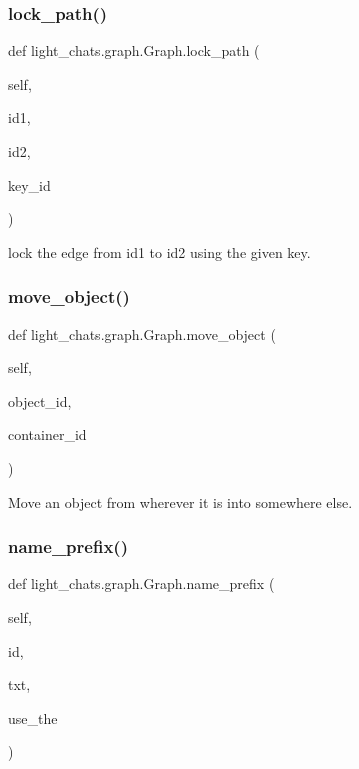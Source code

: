 \subsubsection{\texorpdfstring{lock\+\_\+path()}{lock\_path()}}
{\footnotesize\ttfamily def light\+\_\+chats.\+graph.\+Graph.\+lock\+\_\+path (\begin{DoxyParamCaption}\item[{}]{self,  }\item[{}]{id1,  }\item[{}]{id2,  }\item[{}]{key\+\_\+id }\end{DoxyParamCaption})}

\begin{DoxyVerb}lock the edge from id1 to id2 using the given key.
\end{DoxyVerb}
 \mbox{\label{classlight__chats_1_1graph_1_1Graph_a8a92252320777766ddab522549671f43}} 
\subsubsection{\texorpdfstring{move\+\_\+object()}{move\_object()}}
{\footnotesize\ttfamily def light\+\_\+chats.\+graph.\+Graph.\+move\+\_\+object (\begin{DoxyParamCaption}\item[{}]{self,  }\item[{}]{object\+\_\+id,  }\item[{}]{container\+\_\+id }\end{DoxyParamCaption})}

\begin{DoxyVerb}Move an object from wherever it is into somewhere else.
\end{DoxyVerb}
 \mbox{\label{classlight__chats_1_1graph_1_1Graph_a2da14e9a8a4c547fea59eee63dd9f70c}} 
\subsubsection{\texorpdfstring{name\+\_\+prefix()}{name\_prefix()}}
{\footnotesize\ttfamily def light\+\_\+chats.\+graph.\+Graph.\+name\+\_\+prefix (\begin{DoxyParamCaption}\item[{}]{self,  }\item[{}]{id,  }\item[{}]{txt,  }\item[{}]{use\+\_\+the }\end{DoxyParamCaption})}

